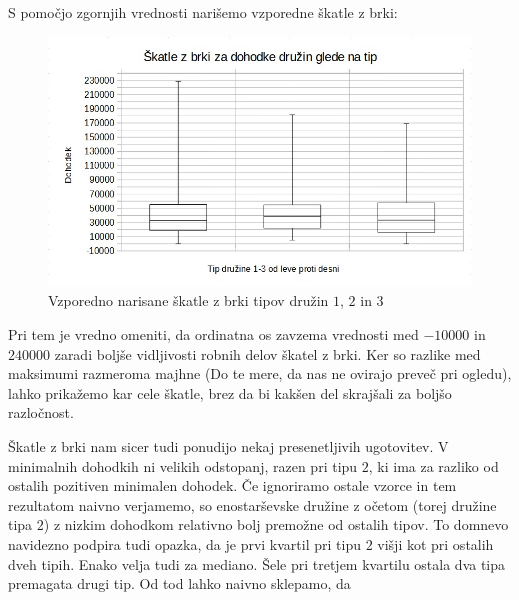 \documentclass[a4paper, 10pt]{article}
\begin{document}
S pomočjo zgornjih vrednosti narišemo vzporedne škatle z brki:
\begin{figure}[h!]
	\centering
	\includegraphics[scale = 0.5]{TabelaSample1}
	\caption{Vzporedno narisane škatle z brki tipov družin $1$, $2$ in $3$}
\end{figure}

Pri tem je vredno omeniti, da ordinatna os zavzema vrednosti med $-10000$ in $240000$ zaradi boljše vidljivosti robnih delov škatel z brki. Ker so razlike med maksimumi razmeroma majhne (Do te mere, da nas ne ovirajo preveč pri ogledu), lahko prikažemo kar cele škatle, brez da bi kakšen del skrajšali za boljšo razločnost. 

Škatle z brki nam sicer tudi ponudijo nekaj presenetljivih ugotovitev. V minimalnih dohodkih ni velikih odstopanj, razen pri tipu $2$, ki ima za razliko od ostalih pozitiven minimalen dohodek. Če ignoriramo ostale vzorce in tem rezultatom naivno verjamemo, so enostarševske družine z očetom (torej družine tipa $2$) z nizkim dohodkom relativno bolj premožne od ostalih tipov. To domnevo navidezno podpira tudi opazka, da je prvi kvartil pri tipu $2$ višji kot pri ostalih dveh tipih. Enako velja tudi za mediano. Šele pri tretjem kvartilu ostala dva tipa premagata drugi tip. Od tod lahko naivno sklepamo, da
\end{document}
